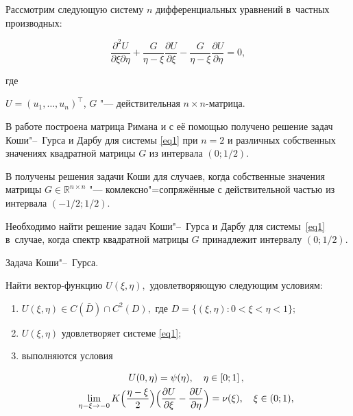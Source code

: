 \smallskip

 Рассмотрим следующую систему $n$ дифференциальных уравнений в~частных производных:

\begin{equation}

  \label{eq1}

  \frac{\partial^{2}U}{\partial \xi \partial \eta}+\frac{G}{\eta - \xi}\frac{\partial U}{\partial \xi}-\frac{G}{\eta - \xi}\frac{\partial U}{\partial \eta}=0,

\end{equation}

где 

  $U=( u_1, \dots, u_n)^\top$, $G$ "--- действительная $n \times n $-матрица.



В работе \cite{Andreev} построена матрица Римана и с её помощью получено решение задач Коши"--~Гурса и Дарбу для системы \eqref{eq1} при $n=2$ и различных собственных значениях квадратной матрицы $G$ из интервала $(0; 1/2)$. 

В \cite{my,my1} получены решения задачи Коши для случаев, когда собственные значения матрицы $G \in \mathbb R^{n\times n}$ "--- комлексно"=сопряжённые с действительной частью из интервала $(-1/2; 1/2)$.





Необходимо найти решение задач Коши"--~Гурса и Дарбу для системы~\eqref{eq1} в~случае, когда спектр квадратной матрицы $G$ принадлежит интервалу $(0; 1/2)$.



\smallskip



{\small \sc Задача Коши"--~Гурса.} 

\it

Найти вектор-функцию $U(\xi,\eta),$ удовлетворяющую следующим условиям\/{\rm:}

\begin{enumerate}

\item[\rm 1)] $U(\xi,\eta)\in C(\bar{D})\cap C^2(D),$ где $D=\{(\xi, \eta): 0< \xi<\eta <1 \};$

\item[\rm 2)] $U(\xi,\eta)$ удовлетворяет системе \rm  \eqref{eq1}; \it

\item[\rm 3)] выполняются  условия

\begin{gather}

  \label{kr1}

  U(0, \eta)=\psi(\eta), \quad  \eta \in \left[0; 1\right],

\\

  \label{kr2}

  \lim\limits_{ \eta - \xi \to -0} K \Bigl(\frac{\eta-\xi}{2}\Bigr)\Bigl(\frac{\partial U}{\partial{\xi}}-\frac{\partial U}{\partial{\eta}}\Bigr)=\nu(\xi),\quad \xi \in (0; 1), 

\end{gather}

\end{enumerate}

